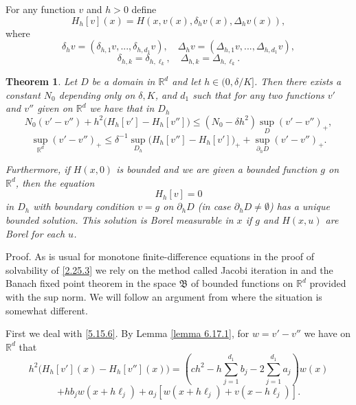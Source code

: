 \documentclass[11pt, reqno]{amsart}
\newtheorem{theorem}{Theorem}[section]
\theoremstyle{definition}
\theoremstyle{remark}
\begin{document}
For any function $v$ and $h>0$ define
$$
H_{h}[v](x)=H( x,v (x),\delta_{h }v (x),
\Delta_{h}v (x)),
$$
where
$$
\delta_{h }v =(\delta_{h,1}v ,...,
\delta_{h,d_{1} }v ),
\quad \Delta_{h}v =(\Delta_{h,1} v ,...,
\Delta_{h,d_{1}} v ),
$$
$$
\delta_{h,k}=\delta_{h,\ell_{k}},\quad
\Delta_{h,k}=\Delta_{h,\ell_{k}}.
$$
 
\begin{theorem}
                                            \label{theorem 7.12.1}
Let   $D$ be a domain in ${\mathbb{R}}^{d}$ and let  $h\in(0,\delta/K]$. 
Then there exists a constant $N_{0}$ depending only on
$\delta,K$, and $d_{1}$ such that for any two functions
$v'$ and $v''$ given on ${\mathbb{R}}^{d}$ we have that in $D_{h}$
\begin{equation}
                                                       \label{5.15.6}
N_{0}(v' -v'' )+
h^{2}\big(H_{h}[v'] -H_{h}[v''] \big)
\leq
(N_{0}- \delta  h^{2} )
\sup_{D}(v'-v'')_{+},
\end{equation}
\begin{equation}
                                                       \label{7.12.2}
\sup_{{\mathbb{R}}^{d}}(v'-v'')_{+}\leq\delta^{-1}
\sup_{D_{h}}(H_{h}[v''] -H_{h}[v'] \big)_{+}
+\sup_{\partial_{h} D}(v'-v'')_{+}.
\end{equation}

Furthermore, if $H( x,0)$ is bounded and
we are given a bounded function $g$ on ${\mathbb{R}}^{d}$, then the
  equation 
\begin{equation}
                                              \label{2.25.3}
H_{h}[v]=0  
\end{equation} 
in $ D_{h} $ 
with boundary condition
$v=g$ on $\partial_{h}D$ (in case $\partial_{h}D\ne\emptyset$)
has a unique bounded solution.
This solution is Borel measurable in $x$ if $g$
 and $H( x,u)$ are Borel for each $ u$.
\end{theorem}
 

Proof. As is usual for monotone finite-difference equations
in the proof of solvability of \eqref{2.25.3}
we rely on 
the method called Jacobi iteration in \cite{KT92} and
the Banach fixed point theorem
in the space ${\mathfrak{B}}$ of bounded functions on
${\mathbb{R}}^{d}$ provided with the sup norm. 
We will follow an argument from \cite{Kr11}
where the situation is somewhat different.

First we deal with \eqref{5.15.6}.
By Lemma \ref{lemma 6.17.1},
 for   $w=v'-v''$
we have  on ${\mathbb{R}}^{d}$ that
$$
h^{2}\big(H_{h}[v'](x)-H_{h}[v''](x)\big)
=(ch^{2}-h \sum_{j=1}^{d_{1}}b_{j}-2 \sum_{j=1}^{d_{1}}
a_{j})w(x) 
$$
$$
+h b_{j} w (x+h\ell_{j}) + 
a_{j} [w(x+h\ell_{j})  +
v (x-h\ell_{j})].
$$
\end{document}
